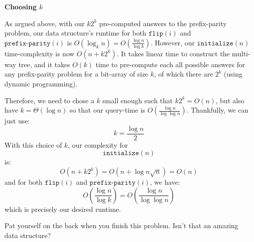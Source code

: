 \documentclass[12pt]{exam}
\newcommand*{\bigtheta}[1]{\Theta\left( #1 \right)}
\newcommand*{\bigo}[1]{O\left( #1 \right)}
\begin{document}
\begin{questions}
\begin{parts}
\begin{solution}
\textbf{Choosing $k$}

As argued above, with our $k2^k$ pre-computed answers to the prefix-parity problem, our data structure's runtime for both $\texttt{flip}(i)$ and $\texttt{prefix-parity}(i)$ is $\bigo{ \log_k n} = \bigo{\frac{\log n}{\log k}}$. However, our $\texttt{initialize}(n)$ time-complexity is now $\bigo{n + k 2^k}$. It takes linear time to construct the multi-way tree, and it takes $\bigo{k}$ time to pre-compute each all possible answers for any prefix-parity problem for a bit-array of size $k$, of which there are $2^k$ (using dynamic programming).


Therefore, we need to chose a $k$ small enough such that $k 2^k = \bigo{n}$, but also have $k = \bigtheta{\log n}$ so that our query-time is $\bigo{\frac{\log n}{ \log \log n}}$. Thankfully, we can just use:
$$
k = \frac{\log n }{ 2}
$$
With this choice of $k$, our complexity for $$\texttt{initialize}(n)$$ is:
$$
  \bigo{n + k 2^k} = \bigo{n + \log n \sqrt{n}} = \bigo{n}
$$
and for both $\texttt{flip}(i)$ and $\texttt{prefix-parity}(i)$, we have:
$$
\bigo{\frac{\log n}{\log k}} = \bigo{\frac{\log n} {\log \log n}}
$$
which is precisely our desired runtime.

\end{solution}
\end{parts}

Pat yourself on the back when you finish this problem. Isn't that an amazing data structure?

\end{questions}
\end{document}
